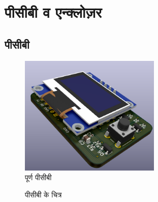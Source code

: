 \section{पीसीबी व एन्क्लोज़र}

	\subsection{पीसीबी}	
	
		\begin{figure}[ht!]
			\centering
			\includegraphics[width=0.6\textwidth]{../common/pcb/pcb.png}
			\caption{पूर्ण पीसीबी}
		\end{figure}


		\begin{figure}[ht!]
			\centering
			\hfill
			\caption{पीसीबी के चित्र}
		\end{figure}

